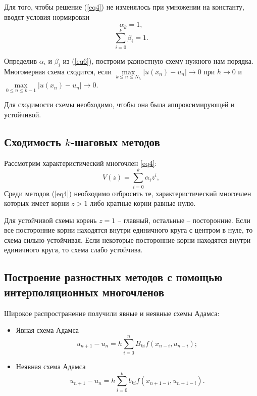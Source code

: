\documentclass[
11pt,
master, %
subf, %
href, %
colorlinks=true, %
times, %
]{disser}
\begin{document}
Для того, чтобы решение (\ref{eq4}) не изменялось при умножении на константу, вводят условия нормировки
\begin{equation}\label{eq6}
  \alpha_k = 1,
\end{equation}
\begin{equation}\label{eq7}
  \sum_{i=0}^{k} \beta_i = 1.
\end{equation}

Определив $\alpha_i$ и $\beta_i$ из (\ref{eq6}), построим разностную схему нужного нам порядка. Многомерная схема сходится, если $\underset{k\leq n\leq N_h}\max|u(x_n) - u_n| \rightarrow 0$ при $h \rightarrow 0$ и $\underset{0\leq n\leq k-1}\max |u(x_n) - u_n| \rightarrow 0$.

Для сходимости схемы необходимо, чтобы она была аппроксимирующей и устойчивой.

\subsection{Сходимость $k$-шаговых методов}
Рассмотрим характеристический многочлен \eqref{eq4}:
$$V(z) = \sum_{i=0}^{k} \alpha_i z^i,$$
Среди методов (\ref{eq4}) необходимо отбросить те, характеристический многочлен которых имеет корни $z>1$ либо кратные корни равные нулю.

Для устойчивой схемы корень $z=1$ -- главный, остальные -- посторонние. Если все посторонние корни находятся внутри единичного круга с центром в нуле, то схема сильно устойчивая. Если некоторые посторонние корни находятся внутри единичного круга, то схема слабо устойчива.

\subsection{Построение разностных методов с помощью интерполяционных многочленов}
Широкое распространение получили явные и неявные схемы Адамса:
\begin{itemize}
  \item Явная схема Адамса
\begin{equation}\label{eq8}
  u_{n+1} - u_n = h\sum_{i=0}^{n} B_{ki} f(x_{n-i},u_{n-i});
\end{equation}
  \item Неявная схема Адамса
\begin{equation}\label{eq9}
  u_{n+1} - u_n = h\sum_{i=0}^{k} b_{ki} f(x_{n+1-i},u_{n+1-i}).
\end{equation}
\end{itemize}
\end{document}
